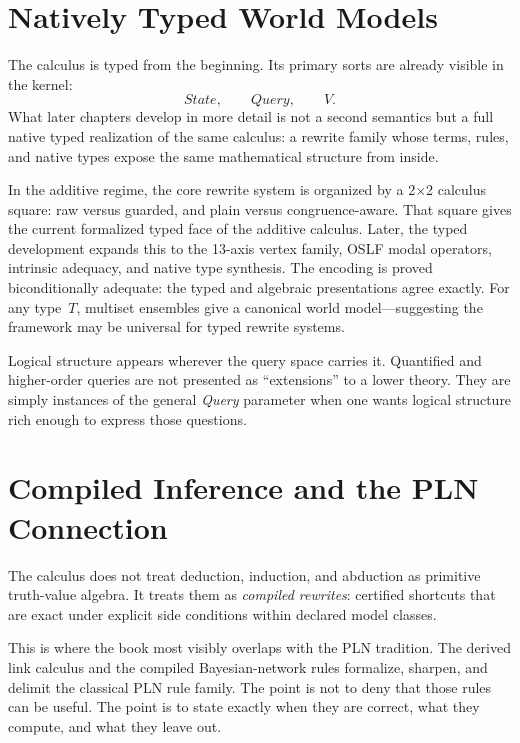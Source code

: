 \section{Natively Typed World Models}
\label{sec:overview-typed}

The calculus is typed from the beginning.  Its primary sorts are already
visible in the kernel:
\[
  \textit{State}, \qquad \textit{Query}, \qquad V.
\]
What later chapters develop in more detail is not a second semantics but a
full native typed realization of the same calculus: a rewrite family whose
terms, rules, and native types expose the same mathematical structure from
inside.

In the additive regime, the core rewrite system is organized by a 2\(\times\)2
calculus square: raw versus guarded, and plain versus congruence-aware.
That square gives the current formalized typed face of the additive calculus.
Later, the typed development expands this to the 13-axis vertex family,
OSLF modal operators, intrinsic adequacy, and native type synthesis.
The encoding is proved biconditionally adequate: the typed and algebraic
presentations agree exactly.  For any type~$T$, multiset ensembles
give a canonical world model---suggesting the framework may be
universal for typed rewrite systems.

Logical structure appears wherever the query space carries it.  Quantified and
higher-order queries are not presented as ``extensions'' to a lower theory.
They are simply instances of the general \textit{Query} parameter when one wants
logical structure rich enough to express those questions.

\section{Compiled Inference and the PLN Connection}
\label{sec:overview-compiled}

The calculus does not treat deduction, induction, and abduction as primitive
truth-value algebra.  It treats them as \emph{compiled rewrites}: certified
shortcuts that are exact under explicit side conditions within declared model
classes.

This is where the book most visibly overlaps with the PLN tradition.  The
derived link calculus and the compiled Bayesian-network rules formalize,
sharpen, and delimit the classical PLN rule family.  The point is not to deny
that those rules can be useful.  The point is to state exactly when they are
correct, what they compute, and what they leave out.

